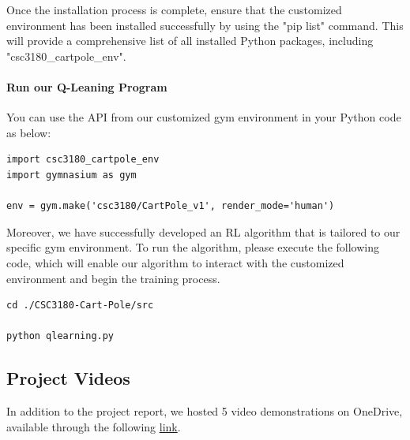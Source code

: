 \documentclass[10pt,a4paper]{article}
\begin{document}
Once the installation process is complete, ensure that the customized environment has been installed successfully by using the "pip list" command. This will provide a comprehensive list of all installed Python packages, including  "csc3180\_cartpole\_env".


\paragraph{Run our Q-Leaning Program}
You can use the API from our customized gym environment in your Python code as below:
\begin{lstlisting}[caption={use the customized environment in python}]
import csc3180_cartpole_env
import gymnasium as gym

env = gym.make('csc3180/CartPole_v1', render_mode='human')
\end{lstlisting}

Moreover, we have successfully developed an RL algorithm that is tailored to our specific gym environment. To run the algorithm, please execute the following code, which will enable our algorithm to interact with the customized environment and begin the training process.

\begin{lstlisting}[caption={To use setup.py to install our env packet}]
cd ./CSC3180-Cart-Pole/src

python qlearning.py
\end{lstlisting}

\subsection{Project Videos}
In addition to the project report, we hosted 5 video demonstrations on OneDrive, available through the following \href{https://1drv.ms/f/s!AmutmbT5H6Pkm0sNJx83Q54XewmB?e=HUkzYK}{link}.
\end{document}
